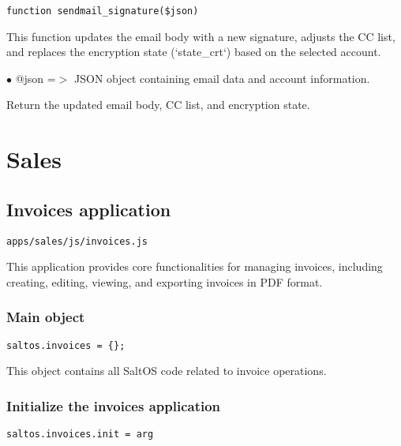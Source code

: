 \documentclass[a4paper]{article}
\begin{document}
\begin{lstlisting}
function sendmail_signature($json)
\end{lstlisting}

This function updates the email body with a new signature, adjusts the CC list,
and replaces the encryption state (`state\_crt`) based on the selected account.

\begin{compactitem}
\item[\color{myblue}$\bullet$] @json =$>$ JSON object containing email data and account information.
\end{compactitem}

Return the updated email body, CC list, and encryption state.


\hypertarget{toc143}{}
\section{Sales}

\hypertarget{toc144}{}
\subsection{Invoices application}

\begin{lstlisting}
apps/sales/js/invoices.js
\end{lstlisting}

This application provides core functionalities for managing invoices, including creating,
editing, viewing, and exporting invoices in PDF format.

\hypertarget{toc145}{}
\subsubsection{Main object}

\begin{lstlisting}
saltos.invoices = {};
\end{lstlisting}

This object contains all SaltOS code related to invoice operations.

\hypertarget{toc146}{}
\subsubsection{Initialize the invoices application}

\begin{lstlisting}
saltos.invoices.init = arg
\end{lstlisting}
\end{document}
